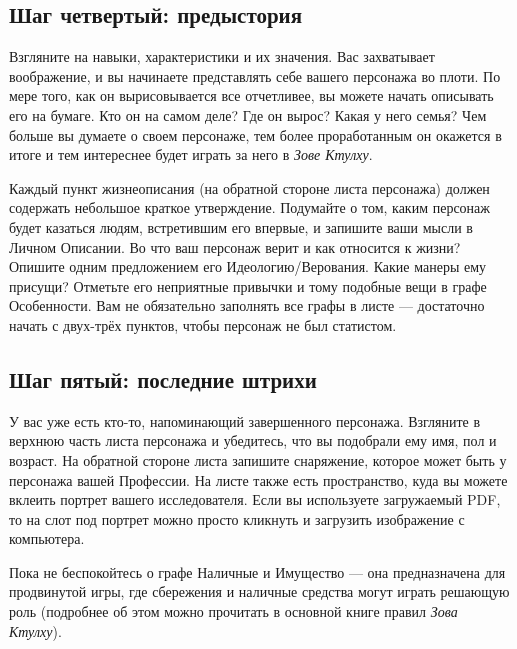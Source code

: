 \documentclass[letterpaper,twocolumn,openany, twoside, 11pt, usenames]{cocbook}
\begin{document}
\subsection*{Шаг четвертый: предыстория}

Взгляните на навыки, характеристики и их значения. Вас захватывает воображение, и вы начинаете представлять себе вашего персонажа во плоти. По мере того, как он вырисовывается все отчетливее, вы можете начать описывать его на бумаге. Кто он на самом деле? Где он вырос? Какая у него семья? Чем больше вы думаете о своем персонаже, тем более проработанным он окажется в итоге и тем интереснее будет играть за него в {\it Зове Ктулху}.

Каждый пункт жизнеописания (на обратной стороне листа персонажа) должен содержать небольшое краткое утверждение. Подумайте о том, каким персонаж будет казаться людям, встретившим его впервые, и запишите ваши мысли в Личном Описании. Во что ваш персонаж верит и как относится к жизни? Опишите одним предложением его Идеологию/Верования. Какие манеры ему присущи? Отметьте его неприятные привычки и тому подобные вещи в графе Особенности. Вам не обязательно заполнять все графы в листе --- достаточно начать с двух-трёх пунктов, чтобы персонаж не был статистом.
\smallbreak
\noindent {}

\subsection*{Шаг пятый: последние штрихи}

У вас уже есть кто-то, напоминающий завершенного персонажа. Взгляните в верхнюю часть листа персонажа и убедитесь, что вы подобрали ему имя, пол и возраст. На обратной стороне листа запишите снаряжение, которое может быть у персонажа вашей Профессии.
\smallbreak
\noindent {}
\smallbreak
На листе также есть пространство, куда вы можете вклеить портрет вашего исследователя. Если вы используете загружаемый PDF, то на слот под портрет можно просто кликнуть и загрузить изображение с компьютера.

Пока не беспокойтесь о графе Наличные и Имущество --- она предназначена для продвинутой игры, где сбережения и наличные средства могут играть решающую роль (подробнее об этом можно прочитать в основной книге правил {\it Зова Ктулху}).
\end{document}
